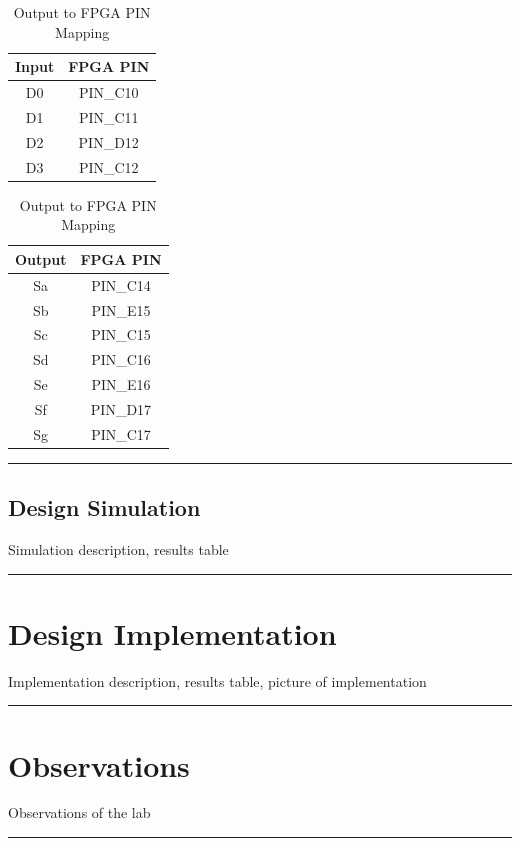 \documentclass{article}
\begin{document}
\begin{table}[H]
\centering
\begin{minipage}{0.45\textwidth}
\centering
\begin{tabular}{|c|c|}
\hline
Input & FPGA PIN \\
\hline
D0 & PIN\_C10 \\ \hline
D1 & PIN\_C11 \\ \hline
D2 & PIN\_D12 \\ \hline
D3 & PIN\_C12 \\
\hline
\end{tabular}
\caption{Input to FPGA PIN Mapping}
\end{minipage}
\hfill
\begin{minipage}{0.45\textwidth}
\centering
\begin{tabular}{|c|c|}
\hline
Output & FPGA PIN \\
\hline
Sa & PIN\_C14 \\ \hline
Sb & PIN\_E15 \\ \hline
Sc & PIN\_C15 \\ \hline
Sd & PIN\_C16 \\ \hline
Se & PIN\_E16 \\ \hline
Sf & PIN\_D17 \\ \hline
Sg & PIN\_C17 \\
\hline
\end{tabular}
\caption{Output to FPGA PIN Mapping}
\end{minipage}
\end{table}
\vspace{5mm}
\hrule
\subsection*{\textcolor{mycolor}{Design Simulation}}
Simulation description, results table
\vspace{5mm}
\hrule

\section*{\textcolor{mycolor}{Design Implementation}}
Implementation description, results table, picture of implementation
\vspace{5mm}
\hrule

\section*{\textcolor{mycolor}{Observations}}
Observations of the lab
\vspace{5mm}
\hrule
\end{document}
